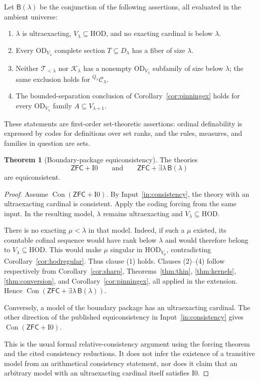 \documentclass[11pt,letterpaper]{article}
\theoremstyle{definition}
\newtheorem{theorem}[definition]{Theorem}
\numberwithin{equation}{section}
\newcommand{\ZFC}{\mathsf{ZFC}}
\newcommand{\HOD}{\mathrm{HOD}}
\newcommand{\OD}{\mathrm{OD}}
\newcommand{\Con}{\operatorname{Con}}
\newcommand{\Izero}{\mathrm{I0}}
\newcommand{\Thin}{\mathcal T_{<\lambda}}
\newcommand{\Ker}{\mathcal K_\lambda}
\begin{document}
Let $\mathsf{B}(\lambda)$ be the conjunction of the following assertions, all evaluated in the ambient universe:
\begin{enumerate}
\item $\lambda$ is ultraexacting, $V_\lambda\subseteq\HOD$, and no exacting cardinal is below $\lambda$.
\item Every $\OD_{V_\lambda}$ complete section $T\subseteq D_\lambda$ has a fiber of size $\lambda$.
\item Neither $\Thin$ nor $\Ker$ has a nonempty $\OD_{V_\lambda}$ subfamily of size below $\lambda$; the same exclusion holds for ${}^{Q_\lambda}\mathcal C_\lambda$.
\item The bounded-separation conclusion of Corollary~\ref{cor:pinningex} holds for every $\OD_{V_\lambda}$ family $A\subseteq V_{\lambda+1}$.
\end{enumerate}
These statements are first-order set-theoretic assertions: ordinal definability is expressed by codes for definitions over set ranks, and the rules, measures, and families in question are sets.

\begin{theorem}[Boundary-package equiconsistency]\label{thm:equiconsistency}
The theories
\[
 \ZFC+\Izero
 \qquad\text{and}\qquad
 \ZFC+\exists\lambda\,\mathsf B(\lambda)
\]
are equiconsistent.
\end{theorem}
\begin{proof}
Assume $\Con(\ZFC+\Izero)$. By Input~\ref{in:consistency}, the theory with an ultraexacting cardinal is consistent. Apply the coding forcing from the same input. In the resulting model, $\lambda$ remains ultraexacting and $V_\lambda\subseteq\HOD$.

There is no exacting $\mu<\lambda$ in that model. Indeed, if such a $\mu$ existed, its countable cofinal sequence would have rank below $\lambda$ and would therefore belong to $V_\lambda\subseteq\HOD$. This would make $\mu$ singular in $\HOD_{V_\mu}$, contradicting Corollary~\ref{cor:hodregular}. Thus clause (1) holds. Clauses (2)--(4) follow respectively from Corollary~\ref{cor:sharp}, Theorems~\ref{thm:thin}, \ref{thm:kernels}, \ref{thm:conversion}, and Corollary~\ref{cor:pinningex}, all applied in the extension. Hence $\Con(\ZFC+\exists\lambda\,\mathsf B(\lambda))$.

Conversely, a model of the boundary package has an ultraexacting cardinal. The other direction of the published equiconsistency in Input~\ref{in:consistency} gives $\Con(\ZFC+\Izero)$.

This is the usual formal relative-consistency argument using the forcing theorem and the cited consistency reductions. It does not infer the existence of a transitive model from an arithmetical consistency statement, nor does it claim that an arbitrary model with an ultraexacting cardinal itself satisfies $\Izero$.
\end{proof}
\end{document}
